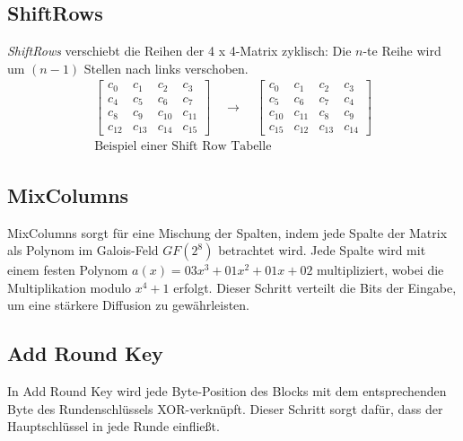 \subsection{ShiftRows}
\textit{ShiftRows} verschiebt die Reihen der 4 x 4-Matrix zyklisch: Die $n$-te Reihe wird um $(n-1)$ Stellen nach links verschoben.
\[
\begin{array}{c}
\begin{bmatrix}
c_0  & c_1  & c_2  & c_3  \\
c_4  & c_5  & c_6  & c_7  \\
c_8  & c_9  & c_{10} & c_{11} \\
c_{12} & c_{13} & c_{14} & c_{15}
\end{bmatrix}
\quad\rightarrow\quad
\begin{bmatrix}
c_0  & c_1  & c_2  & c_3  \\
c_5  & c_6  & c_7  & c_4  \\
c_{10} & c_{11} & c_8  & c_9  \\
c_{15} & c_{12} & c_{13} & c_{14}
\end{bmatrix}\\
\text{Beispiel einer Shift Row Tabelle}
\end{array}
\]

\subsection{MixColumns}
MixColumns sorgt für eine Mischung der Spalten, indem jede Spalte der Matrix als Polynom im Galois-Feld \(GF(2^8)\) betrachtet wird. Jede Spalte wird mit einem festen Polynom \(a(x) = 03x^3 + 01x^2 + 01x + 02\) multipliziert, wobei die Multiplikation modulo \(x^4 + 1\) erfolgt. Dieser Schritt verteilt die Bits der Eingabe, um eine stärkere Diffusion zu gewährleisten.

\subsection{Add Round Key}
In Add Round Key wird jede Byte-Position des Blocks mit dem entsprechenden Byte des Rundenschlüssels XOR-verknüpft. Dieser Schritt sorgt dafür, dass der Hauptschlüssel in jede Runde einfließt.
